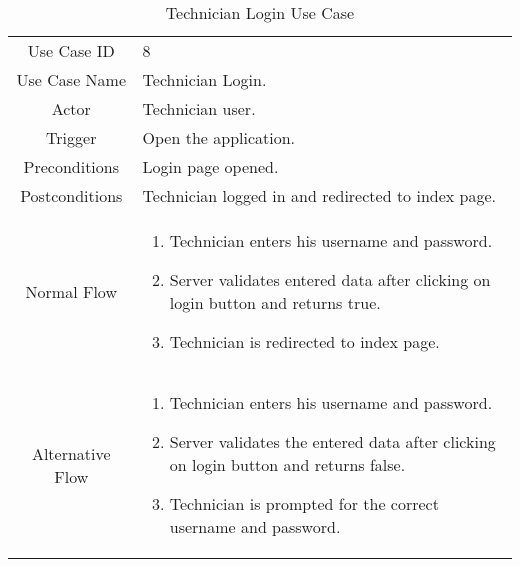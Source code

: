 	\begin{table}[H]
		\centering
		\renewcommand{\arraystretch}{1.5}
		\begin{tabular}[t]{ c  m{10cm} }
			Use Case ID & 8  \\
			Use Case Name & Technician Login. \\
			Actor & Technician user. \\
			Trigger & Open the application. \\
			Preconditions & Login page opened. \\
			Postconditions & Technician logged in and redirected to index page. \\
			Normal Flow &\begin{enumerate}
				\item Technician enters his username and password.
				\item Server validates entered data after clicking on login button and returns true.
				\item Technician is redirected to index page.
			\end{enumerate}\\
			Alternative Flow &\begin{enumerate}
				\item Technician enters his username and password.
				\item Server validates the entered data after clicking on login button and returns false.
				\item Technician is prompted for the correct username and password.
			\end{enumerate} \\
		\end{tabular}
		\caption{Technician Login Use Case}
		\renewcommand{\arraystretch}{1.0}
	\end{table}
	
